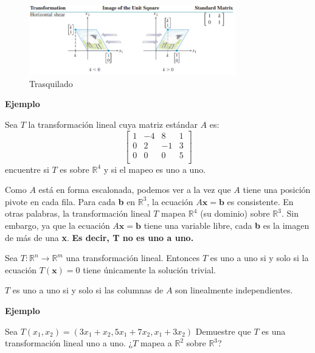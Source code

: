 \documentclass{article}
\begin{document}
\begin{figure}[ht]
    \centerline{\includegraphics[width=0.8\textwidth]{image26.png}}
    \caption{Trasquilado}
  \end{figure}

\begin{large}
    \textbf{Ejemplo}
\end{large}

Sea $T$ la transformación lineal cuya matriz estándar $A$ es: $$\left[\begin{array}{rrrr}
        1 & -4 & 8 & 1 \\
        0 & 2 & -1 & 3 \\
        0 & 0 & 0 & 5 \\
\end{array}\right]$$ encuentre si $T$ es sobre $\mathbb{R}^4$ y si el mapeo es uno a uno.

Como $A$ está en forma escalonada, podemos ver a la vez que $A$ tiene una posición pivote en cada fila. Para cada \textbf{b} en $\mathbb{R}^3$, la 
ecuación $A\mathbf{x} = \mathbf{b}$ es consistente. En otras palabras, la transformación lineal $T$ mapea $\mathbb{R}^4$ (su dominio) sobre $\mathbb{R}^3$. Sin embargo, ya que la ecuación $A\mathbf{x} = \mathbf{b}$ tiene una variable libre, cada \textbf{b} es la imagen de más de una \textbf{x}. \textbf{Es decir, T no es uno a uno.}

\begin{tcolorbox}[colback=blue!10!white,colframe=blue!60!black,title=Unicidad]
    Sea $T: \mathbb{R}^n \rightarrow \mathbb{R}^m$ una transformación lineal. Entonces $T$ es uno a uno si y solo si la ecuación $T(\mathbf{x}) = 0$ tiene únicamente la solución trivial. 

    $T$ es uno a uno si y solo si las columnas de $A$ son linealmente independientes.
\end{tcolorbox}

\begin{large}
    \textbf{Ejemplo}
\end{large}

Sea $T(x_1, x_2) = (3x_1 + x_2, 5x_1 + 7x_2, x_1 + 3x_2)$ Demuestre que $T$ es una transformación lineal uno a uno. ¿$T$ mapea a $\mathbb{R}^2$ sobre $\mathbb{R}^3$?
\end{document}
